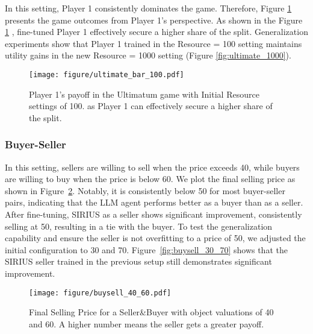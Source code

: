 In this setting, Player 1 consistently dominates the game. Therefore, Figure \ref{fig:ultimate_100} presents the game outcomes from Player 1's perspective. As shown in the Figure \ref{fig:ultimate_100} , \model{} fine-tuned Player 1 effectively secure a higher share of the split.  Generalization experiments show that \model{} Player 1 trained in the Resource = 100 setting maintains utility gains in the new Resource = 1000 setting (Figure \ref{fig:ultimate_1000}).
\begin{figure}[htbp]
    \centering
    \texttt{[image: figure/ultimate\_bar\_100.pdf]}
    \caption{Player 1's payoff in the Ultimatum game with Initial Resource settings of 100. \model{} as Player 1 can effectively secure a higher share of the split.}
    \label{fig:ultimate_100}
\end{figure}







\subsubsection{Buyer-Seller}
In this setting, sellers are willing to sell when the price exceeds 40, while buyers are willing to buy when the price is below 60.  We plot the final selling price as shown in Figure~\ref{fig:buysell_40_60}.
Notably, it is consistently below 50 for most buyer-seller pairs, indicating that the LLM agent performs better as a buyer than as a seller. After fine-tuning, SIRIUS as a seller shows significant improvement, consistently selling at 50, resulting in a tie with the buyer. 
To test the generalization capability and ensure the seller is not overfitting to a price of 50, we adjusted the initial configuration to 30 and 70. Figure~\ref{fig:buysell_30_70} shows that the SIRIUS seller trained in the previous setup still demonstrates significant improvement.


\begin{figure}[h!]
    \centering
    \texttt{[image: figure/buysell\_40\_60.pdf]}
    \caption{Final Selling Price for a Seller\&Buyer with object valuations of 40 and 60. A higher number means the seller gets a greater payoff.}
    \label{fig:buysell_40_60}
\end{figure}


